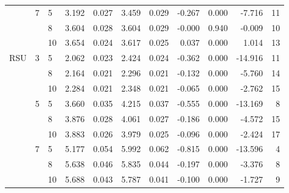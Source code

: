 \begin{tabular}{lllrrrrrrrr}
    & 7 & 5  &    3.192 &     0.027 &  3.459 &     0.029 &     -0.267 &   0.000 &    -7.716 &  11 \\
    &   & 8  &    3.604 &     0.028 &  3.604 &     0.029 &     -0.000 &   0.940 &    -0.009 &  10 \\
    &   & 10 &    3.654 &     0.024 &  3.617 &     0.025 &      0.037 &   0.000 &     1.014 &  13 \\
RSU & 3 & 5  &    2.062 &     0.023 &  2.424 &     0.024 &     -0.362 &   0.000 &   -14.916 &  11 \\
    &   & 8  &    2.164 &     0.021 &  2.296 &     0.021 &     -0.132 &   0.000 &    -5.760 &  14 \\
    &   & 10 &    2.284 &     0.021 &  2.348 &     0.021 &     -0.065 &   0.000 &    -2.762 &  15 \\
    & 5 & 5  &    3.660 &     0.035 &  4.215 &     0.037 &     -0.555 &   0.000 &   -13.169 &   8 \\
    &   & 8  &    3.876 &     0.028 &  4.061 &     0.027 &     -0.186 &   0.000 &    -4.572 &  15 \\
    &   & 10 &    3.883 &     0.026 &  3.979 &     0.025 &     -0.096 &   0.000 &    -2.424 &  17 \\
    & 7 & 5  &    5.177 &     0.054 &  5.992 &     0.062 &     -0.815 &   0.000 &   -13.596 &   4 \\
    &   & 8  &    5.638 &     0.046 &  5.835 &     0.044 &     -0.197 &   0.000 &    -3.376 &   8 \\
    &   & 10 &    5.688 &     0.043 &  5.787 &     0.041 &     -0.100 &   0.000 &    -1.727 &   9 \\
\bottomrule
\end{tabular}
